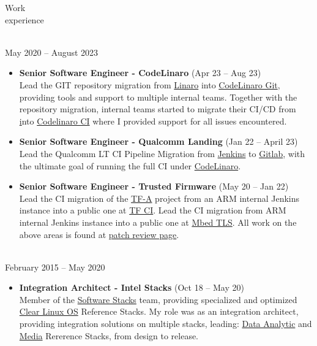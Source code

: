 \documentclass{resume}
\def\linaro{Linaro Limited}
\def\intel{Intel Corporation}
\def\cl{Clear Linux OS}
\begin{document}
\begin{category}{Work \\experience}

\citem{\linaro}\\
May 2020 -- August 2023

\begin{itemize}
\item \textbf{Senior Software Engineer - CodeLinaro} (Apr 23 -- Aug 23)\\
  Lead the GIT repository migration from \href{git.linaro.org}{Linaro}  into
  \href{git.codelinaro.org}{CodeLinaro Git}, providing tools and support to multiple internal teams.
  Together with the repository migration, internal teams started to migrate their CI/CD from
  \href{ci.linaro.org} into \href{git.codelinaro.org}{Codelinaro CI} where I provided support
  for all issues encountered.
\end{itemize}

\begin{itemize}
\item \textbf{Senior Software Engineer - Qualcomm Landing} (Jan 22 -- April 23)\\
  Lead the Qualcomm LT CI Pipeline Migration from \href{https://ci.linaro.org/view/qclt/}{Jenkins} to
  \href{https://gitlab.com/lt-qcom-gitlab-ci}{Gitlab}, with the ultimate goal of running the full CI
  under \href{https://www.codelinaro.org/}{CodeLinaro}.
\end{itemize}

\begin{itemize}
\item \textbf{Senior Software Engineer - Trusted Firmware} (May 20 -- Jan 22)\\
  Lead the CI migration of the \href{https://www.trustedfirmware.org/projects/tf-a/}{TF-A}
  project from an ARM internal Jenkins instance into a public one at \href{https://ci.trustedfirmware.org/}{TF CI}.
  Lead the CI migration from ARM internal Jenkins instance into a public one at \href{https://github.com/ARMmbed/mbedtls}{Mbed TLS}.
  All work on the above areas is found at
  \href{https://review.trustedfirmware.org/q/owner:leonardo.sandoval%2540linaro.org}{patch review page}.
\end{itemize}

\citem{\intel}\\
February 2015 -- May 2020

\begin{itemize}
\item \textbf{Integration Architect - Intel Stacks} (Oct 18 -- May 20)\\
  Member of the \href{https://github.com/intel/stacks}{Software Stacks} team,
  providing specialized and optimized \href{https://clearlinux.org/}{\cl} Reference Stacks.
  My role was as an integration architect, providing integration solutions on multiple stacks,
  leading: \href{https://github.com/intel/stacks/blob/master/dars/dars.rst}{Data Analytic}
  and \href{https://github.com/intel/stacks/blob/master/mers/README.md}{Media} Rererence Stacks,
  from design to release.
\end{itemize}


\end{category}
\end{document}

